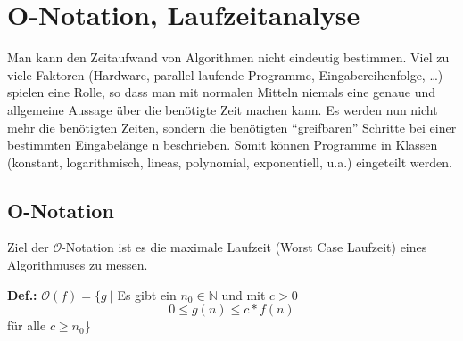 \chapter{O-Notation, Laufzeitanalyse}
Man kann den Zeitaufwand von Algorithmen nicht eindeutig bestimmen.
Viel zu viele Faktoren (Hardware, parallel laufende Programme, Eingabereihenfolge, \dots) spielen eine Rolle, so dass man mit normalen Mitteln niemals eine genaue und allgemeine Aussage über die benötigte Zeit machen kann.
Es werden nun nicht mehr die benötigten Zeiten, sondern die benötigten ``greifbaren'' Schritte bei einer bestimmten Eingabelänge n beschrieben.
Somit können Programme in Klassen (konstant, logarithmisch, lineas, polynomial, exponentiell, u.a.) eingeteilt werden.

\section{O-Notation}
Ziel der \(\mathcal{O}\)-Notation ist es die maximale Laufzeit (Worst Case Laufzeit) eines Algorithmuses zu messen.
\begin{shaded}
	\noindent
	\textbf{Def.:} \(\mathcal{O}(f) = \{ g\:|\) Es gibt ein \(n_{0} \in \mathbb{N}\) und mit \(c > 0\)
		\[0\leq g(n)\leq c*f(n)\] 
		für alle \( c\geq n_0\)\}
\end{shaded}

